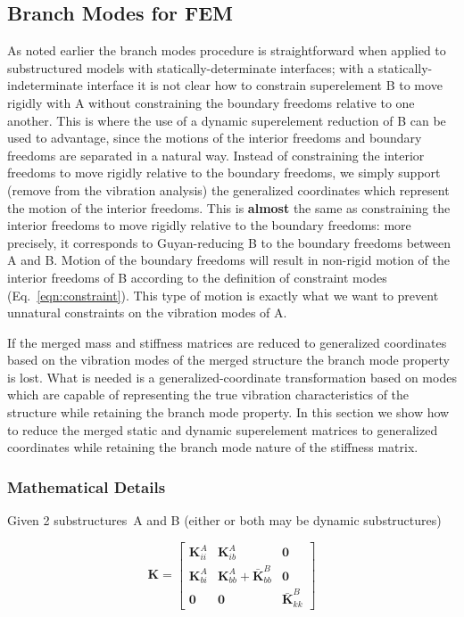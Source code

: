 \documentclass[11pt,openany,twoside]{book}
\numberwithin{equation}{section}		%
\newcommand{\Matrix}[1]{\boldsymbol{#1}}
\newcommand{\Eqn}[1]{Eq.\ \ref{#1}}  %
\newcommand{\Sss}{substructures}
\begin{document}
\subsection{Branch Modes for FEM} \label{bm-extended}
As noted earlier
the branch modes procedure is straightforward
when applied to substructured models with statically-determinate
interfaces;
with a statically-indeterminate interface it is
not clear how to constrain superelement B to move rigidly
with A without constraining the boundary freedoms relative to one another.
This is where the use of a dynamic superelement reduction
of B can be used to advantage, since the motions of the
interior freedoms and boundary freedoms are separated
in a natural way.
Instead of constraining the interior freedoms to
move rigidly relative to the boundary freedoms,
we simply support (remove from the vibration analysis)
the generalized coordinates which represent the motion
of the interior freedoms.
This is {\bfseries almost\/}
the same as constraining the interior freedoms to
move rigidly relative to the boundary freedoms:
more precisely, it corresponds to Guyan-reducing
B to the boundary freedoms between A and B.
Motion of the boundary freedoms will result in
non-rigid motion of the interior freedoms of B according to
the definition of constraint modes (\Eqn{eqn:constraint}).
This type of motion is exactly what we want to prevent
unnatural constraints on the vibration modes of A.
\par
If the merged mass and stiffness matrices are reduced to
generalized coordinates based on the vibration modes of
the merged structure the branch mode property is lost.
What is needed is a generalized-coordinate transformation
based on modes which are capable of representing the true vibration
characteristics of the structure while retaining the branch mode
property.
In this section we show how to reduce the merged static and
dynamic superelement matrices to generalized coordinates
while retaining the branch mode nature of the stiffness matrix.
\subsubsection{Mathematical Details}
\par
Given 2 \Sss\ A and B (either or both may be dynamic \Sss)

\begin{equation}
\Matrix{K} = \left[
\begin{array}{ccc}
   \Matrix{K}_{ii}^A & \Matrix{K}_{ib}^A & \Matrix{0} \\
   \Matrix{K}_{bi}^A & \Matrix{K}_{bb}^A + \Matrix{\bar{K}}_{bb}^B & \Matrix{0} \\
   \Matrix{0} & \Matrix{0} & \Matrix{\bar{K}}_{kk}^B
\end{array}
\right]				\nonumber
\end{equation}
\end{document}
